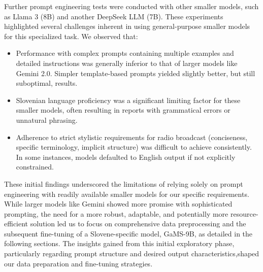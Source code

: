 \documentclass[fleqn,moreauthors,10pt]{ds_report}
\begin{document}
Further prompt engineering tests were conducted with other smaller models, such as Llama 3 (8B) and another DeepSeek LLM (7B). These experiments highlighted several challenges inherent in using general-purpose smaller models for this specialized task. We observed that:
\begin{itemize}
    \item Performance with complex prompts containing multiple examples and detailed instructions was generally inferior to that of larger models like Gemini 2.0. Simpler template-based prompts yielded slightly better, but still suboptimal, results.
    \item Slovenian language proficiency was a significant limiting factor for these smaller models, often resulting in reports with grammatical errors or unnatural phrasing.
    \item Adherence to strict stylistic requirements for radio broadcast (conciseness, specific terminology, implicit structure) was difficult to achieve consistently. In some instances, models defaulted to English output if not explicitly constrained.
\end{itemize}
These initial findings underscored the limitations of relying solely on prompt engineering with readily available smaller models for our specific requirements. While larger models like Gemini showed more promise with sophisticated prompting, the need for a more robust, adaptable, and potentially more resource-efficient solution led us to focus on comprehensive data preprocessing and the subsequent fine-tuning of a Slovene-specific model, GaMS-9B, as detailed in the following sections. The insights gained from this initial exploratory phase, particularly regarding prompt structure and desired output characteristics,shaped our data preparation and fine-tuning strategies.

\end{document}
